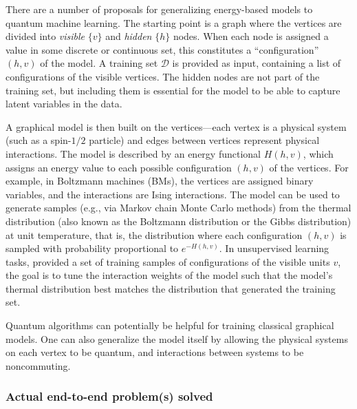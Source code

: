 \begin{refsection}
There are a number of proposals for generalizing energy-based models to quantum machine learning. The starting point is a graph where the vertices are divided into \textit{visible} $\{v\}$ and \textit{hidden} $\{h\}$ nodes. When each node is assigned a value in some discrete or continuous set, this constitutes a ``configuration'' $(h,v)$ of the model. A training set $\mathcal{D}$ is provided as input, containing a list of configurations of the visible vertices. The hidden nodes are not part of the training set, but including them is essential for the model to be able to capture latent variables in the data.

A graphical model is then built on the vertices---each vertex is a physical system (such as a spin-$1/2$ particle) and edges between vertices represent physical interactions. The model is described by an energy functional $H(h,v)$, which assigns an energy value to each possible configuration $(h,v)$ of the vertices.  For example, in Boltzmann machines (BMs), the vertices are assigned binary variables, and the interactions are Ising interactions. The model can be used to generate samples (e.g., via Markov chain Monte Carlo methods) from the thermal distribution (also known as the Boltzmann distribution or the Gibbs distribution) at unit temperature, that is, the distribution where each configuration $(h,v)$ is sampled with probability proportional to $e^{-H(h,v)}$. In unsupervised learning tasks, provided a set of training samples of configurations of the visible units $v$, the goal is to tune the interaction weights of the model such that the model's thermal distribution best matches the distribution that generated the training set. 

Quantum algorithms can potentially be helpful for training classical graphical models. One can also generalize the model itself by allowing the physical systems on each vertex to be quantum, and interactions between systems to be noncommuting. 

\subsubsection*{Actual end-to-end problem(s) solved}



\end{refsection}
